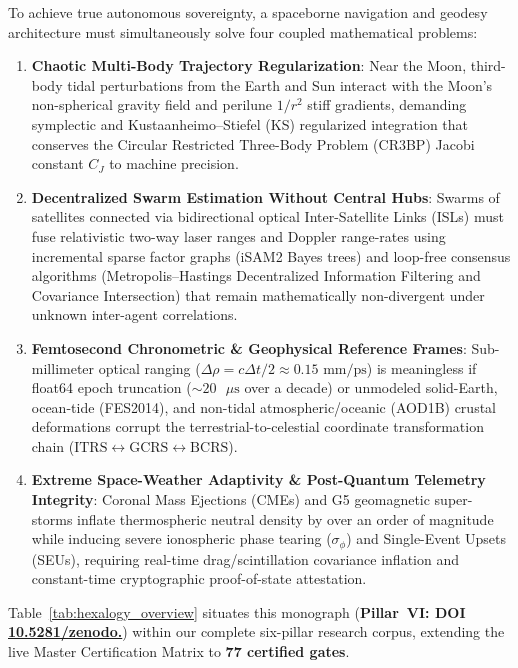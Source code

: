 \documentclass[11pt,a4paper,reqno]{article}
\def\texttt#1{#1}%
\newcommand{\zenodo}[1]{\href{https://doi.org/10.5281/zenodo.#1}{\texttt{10.5281/\allowbreak zenodo.\allowbreak #1}}}
\theoremstyle{plain}
\theoremstyle{definition}
\theoremstyle{remark}
\numberwithin{equation}{section}
\begin{document}
To achieve true autonomous sovereignty, a spaceborne navigation and geodesy architecture must simultaneously solve four coupled mathematical problems:
\begin{enumerate}[leftmargin=1.8em,itemsep=2pt]
  \item \textbf{Chaotic Multi-Body Trajectory Regularization}: Near the Moon, third-body tidal perturbations from the Earth and Sun interact with the Moon's non-spherical gravity field and perilune $1/r^2$ stiff gradients, demanding symplectic and Kustaanheimo--Stiefel (KS) regularized integration that conserves the Circular Restricted Three-Body Problem (CR3BP) Jacobi constant $C_J$ to machine precision.
  \item \textbf{Decentralized Swarm Estimation Without Central Hubs}: Swarms of satellites connected via bidirectional optical Inter-Satellite Links (ISLs) must fuse relativistic two-way laser ranges and Doppler range-rates using incremental sparse factor graphs (iSAM2 Bayes trees) and loop-free consensus algorithms (Metropolis--Hastings Decentralized Information Filtering and Covariance Intersection) that remain mathematically non-divergent under unknown inter-agent correlations.
  \item \textbf{Femtosecond Chronometric \& Geophysical Reference Frames}: Sub-millimeter optical ranging ($\Delta\rho = c\Delta t / 2 \approx 0.15\text{ mm/ps}$) is meaningless if float64 epoch truncation ($\sim 20\text{ }\mu\text{s}$ over a decade) or unmodeled solid-Earth, ocean-tide (FES2014), and non-tidal atmospheric/oceanic (AOD1B) crustal deformations corrupt the terrestrial-to-celestial coordinate transformation chain ($\text{ITRS} \leftrightarrow \text{GCRS} \leftrightarrow \text{BCRS}$).
  \item \textbf{Extreme Space-Weather Adaptivity \& Post-Quantum Telemetry Integrity}: Coronal Mass Ejections (CMEs) and G5 geomagnetic super-storms inflate thermospheric neutral density by over an order of magnitude while inducing severe ionospheric phase tearing ($\sigma_\phi$) and Single-Event Upsets (SEUs), requiring real-time drag/scintillation covariance inflation and constant-time cryptographic proof-of-state attestation.
\end{enumerate}

Table~\ref{tab:hexalogy_overview} situates this monograph (\textbf{Pillar~VI: DOI \zenodo{23227003}}) within our complete six-pillar research corpus, extending the live Master Certification Matrix to \textbf{77 certified gates}.
\end{document}
